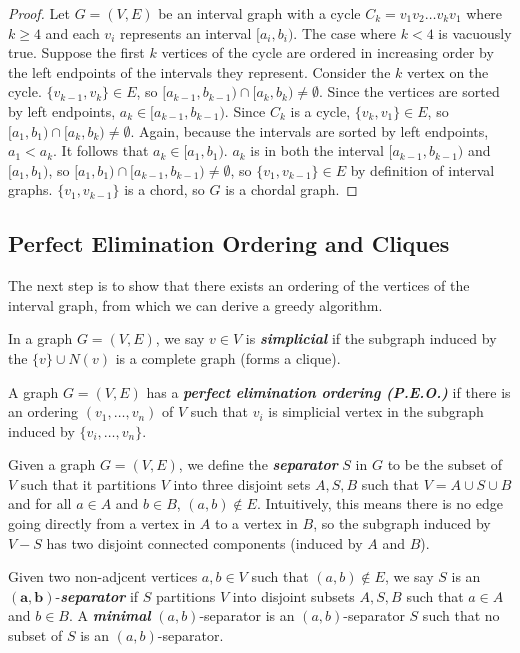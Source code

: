 \begin{proof}
    Let $G=(V,E)$ be an interval graph with a cycle $C_k = v_1v_2\ldots v_kv_1$ where $k \geq 4$ and each $v_i$ represents an interval $[a_i,b_i)$. The case where $k < 4$ is vacuously true. Suppose the first $k$ vertices of the cycle are ordered in increasing order by the left endpoints of the intervals they represent. Consider the $k$ vertex on the cycle. $\{v_{k-1},v_k\} \in E$, so $[a_{k-1},b_{k-1}) \cap [a_k,b_k) \neq \emptyset$. Since the vertices are sorted by left endpoints, $a_k \in [a_{k-1},b_{k-1})$. Since $C_k$ is a cycle, $\{v_k,v_1\} \in E$, so $[a_1,b_1) \cap [a_k,b_k) \neq \emptyset$. Again, because the intervals are sorted by left endpoints, $a_1 < a_k$. It follows that $a_k \in [a_1,b_1)$. $a_k$ is in both the interval $[a_{k-1},b_{k-1})$ and $[a_1,b_1)$, so $[a_1,b_1) \cap [a_{k-1},b_{k-1}) \neq \emptyset$, so $\{v_1,v_{k-1}\} \in E$ by definition of interval graphs. $\{v_1,v_{k-1}\}$ is a chord, so $G$ is a chordal graph.
\end{proof}

\subsection{Perfect Elimination Ordering and Cliques}

The next step is to show that there exists an ordering of the vertices of the interval graph, from which we can derive a greedy algorithm.

\begin{definition}
    In a graph $G=(V,E)$, we say $v \in V$ is \textit{\textbf{simplicial}} if the subgraph induced by the $\{v\} \cup N(v)$ is a complete graph (forms a clique).
\end{definition}

\begin{definition}
    A graph $G=(V,E)$ has a \textit{\textbf{perfect elimination ordering (P.E.O.)}} if there is an ordering $(v_1,\ldots,v_n)$ of $V$ such that $v_i$ is simplicial vertex in the subgraph induced by $\{v_i,\ldots,v_n\}$. 
\end{definition}

\begin{definition}
    Given a graph $G=(V,E)$, we define the \textit{\textbf{separator}} $S$ in $G$ to be the subset of $V$ such that it partitions $V$ into three disjoint sets $A,S,B$ such that $V=A\cup S \cup B$ and for all $a \in A$ and $b \in B$, $(a,b) \not\in E$. Intuitively, this means there is no edge going directly from a vertex in $A$ to a vertex in $B$, so the subgraph induced by $V-S$ has two disjoint connected components (induced by $A$ and $B$).

    Given two non-adjcent vertices $a,b \in V$ such that $(a,b) \not\in E$, we say $S$ is an $\mathbf{(a,b)}$-\textit{\textbf{separator}} if $S$ partitions $V$ into disjoint subsets $A,S,B$ such that $a \in A$ and $b \in B$. A \textit{\textbf{minimal}} $(a,b)$-separator is an $(a,b)$-separator $S$ such that no subset of $S$ is an $(a,b)$-separator.
\end{definition}

